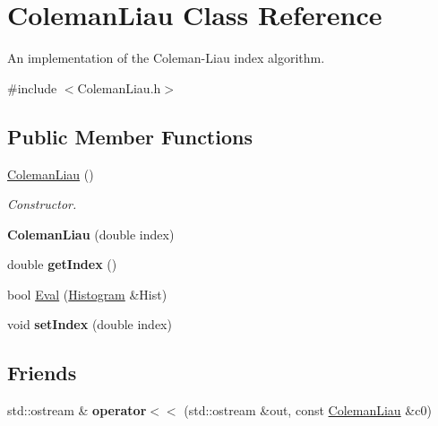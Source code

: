 \hypertarget{classColemanLiau}{}\section{Coleman\+Liau Class Reference}
\label{classColemanLiau}


An implementation of the Coleman-\/\+Liau index algorithm.  




{\ttfamily \#include $<$Coleman\+Liau.\+h$>$}

\subsection*{Public Member Functions}
\begin{DoxyCompactItemize}
\item 
\mbox{\label{classColemanLiau_a4ff77aa5f5ff81d167a8cabad71e620f}} 
\hyperlink{classColemanLiau_a4ff77aa5f5ff81d167a8cabad71e620f}{Coleman\+Liau} ()
\begin{DoxyCompactList}\small\item\em Constructor. \end{DoxyCompactList}\item 
\mbox{\label{classColemanLiau_a0b46f263a2dd687c2fa89bbef88002d0}} 
{\bfseries Coleman\+Liau} (double index)
\item 
\mbox{\label{classColemanLiau_a3a9e5cb64586313a753211c350147cb3}} 
double {\bfseries get\+Index} ()
\item 
bool \hyperlink{classColemanLiau_af0b2de26e53db82cb3e7243de1f26a6f}{Eval} (\hyperlink{classHistogram}{Histogram} \&Hist)
\item 
\mbox{\label{classColemanLiau_a077d1533dfd8145ed729531c6edbfad0}} 
void {\bfseries set\+Index} (double index)
\end{DoxyCompactItemize}
\subsection*{Friends}
\begin{DoxyCompactItemize}
\item 
\mbox{\label{classColemanLiau_a896867aacd954df4faecc74a7010a8b0}} 
std\+::ostream \& {\bfseries operator$<$$<$} (std\+::ostream \&out, const \hyperlink{classColemanLiau}{Coleman\+Liau} \&c0)
\end{DoxyCompactItemize}



